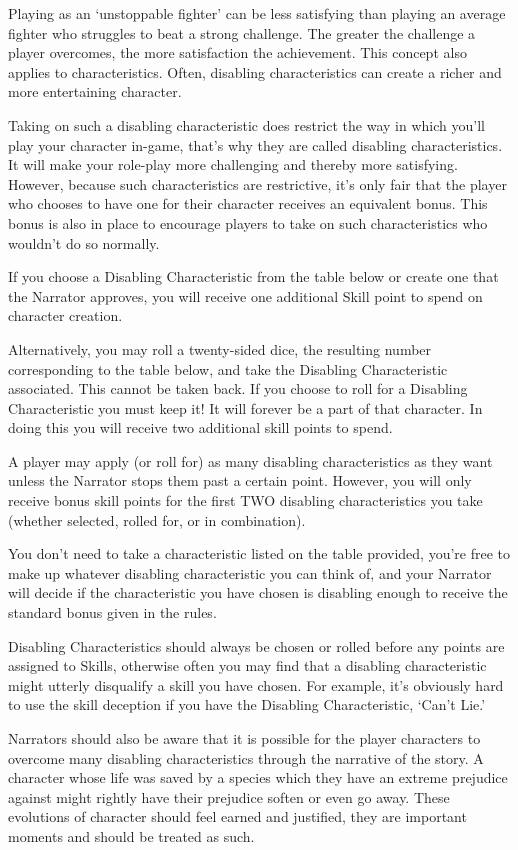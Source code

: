 Playing as an ‘unstoppable fighter’ can be less satisfying than playing an average fighter who struggles to beat a strong challenge. The greater the challenge a player overcomes, the more satisfaction the achievement. This concept also applies to characteristics. Often, disabling characteristics can create a richer and more entertaining character.

Taking on such a disabling characteristic does restrict the way in which you’ll play your character in-game, that’s why they are called disabling characteristics. It will make your role-play more challenging and thereby more satisfying. However, because such characteristics are restrictive, it’s only fair that the player who chooses to have one for their character receives an equivalent bonus. This bonus is also in place to encourage players to take on such characteristics who wouldn’t do so normally.

If you choose a Disabling Characteristic from the table below or create one that the Narrator approves, you will receive one additional Skill point to spend on character creation.

Alternatively, you may roll a twenty-sided dice, the resulting number corresponding to the table below, and take the Disabling Characteristic associated. This cannot be taken back. If you choose to roll for a Disabling Characteristic you must keep it! It will forever be a part of that character. In doing this you will receive two additional skill points to spend.

A player may apply (or roll for) as many disabling characteristics as they want unless the Narrator stops them past a certain point. However, you will only receive bonus skill points for the first TWO disabling characteristics you take (whether selected, rolled for, or in combination).

You don’t need to take a characteristic listed on the table provided, you’re free to make up whatever disabling characteristic you can think of, and your Narrator will decide if the characteristic you have chosen is disabling enough to receive the standard bonus given in the rules.

Disabling Characteristics should always be chosen or rolled before any points are assigned to Skills, otherwise often you may find that a disabling characteristic might utterly disqualify a skill you have chosen. For example, it’s obviously hard to use the skill deception if you have the Disabling Characteristic, ‘Can’t Lie.’

Narrators should also be aware that it is possible for the player characters to overcome many disabling characteristics through the narrative of the story. A character whose life was saved by a species which they have an extreme prejudice against might rightly have their prejudice soften or even go away. These evolutions of character should feel earned and justified, they are important moments and should be treated as such.

